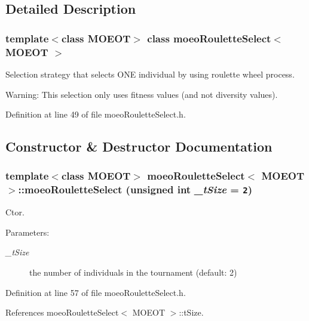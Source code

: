 \subsection{Detailed Description}
\subsubsection*{template$<$class MOEOT$>$ class moeo\-Roulette\-Select$<$ MOEOT $>$}

Selection strategy that selects ONE individual by using roulette wheel process. 

\begin{Desc}
\item[Warning:]This selection only uses fitness values (and not diversity values). \end{Desc}




Definition at line 49 of file moeo\-Roulette\-Select.h.

\subsection{Constructor \& Destructor Documentation}
\subsubsection{\setlength{\rightskip}{0pt plus 5cm}template$<$class MOEOT$>$ \bf{moeo\-Roulette\-Select}$<$ MOEOT $>$::\bf{moeo\-Roulette\-Select} (unsigned int {\em \_\-t\-Size} = {\tt 2})\hspace{0.3cm}{\tt  [inline]}}\label{classmoeoRouletteSelect_4caa45f4c9d1ad2949cc14d2c21b77ea}


Ctor. 

\begin{Desc}
\item[Parameters:]
\begin{description}
\item[{\em \_\-t\-Size}]the number of individuals in the tournament (default: 2) \end{description}
\end{Desc}


Definition at line 57 of file moeo\-Roulette\-Select.h.

References moeo\-Roulette\-Select$<$ MOEOT $>$::t\-Size.

